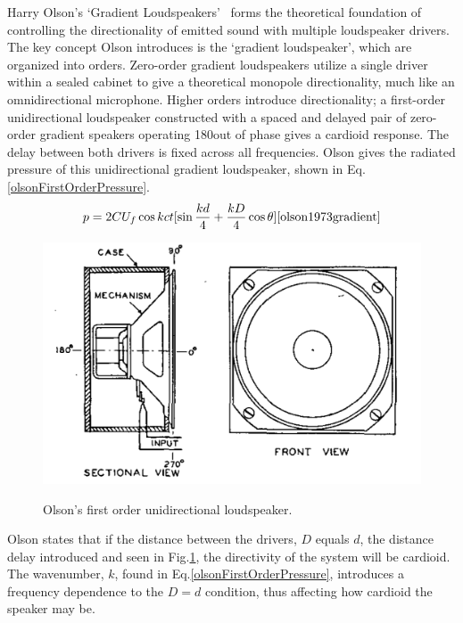 \documentclass{report}
\begin{document}
        Harry Olson's `Gradient Loudspeakers'~\cite{olson1973gradient} forms the theoretical foundation of controlling the directionality of emitted sound with multiple loudspeaker drivers.
        The key concept Olson introduces is the `gradient loudspeaker', which are organized into orders.
        Zero-order gradient loudspeakers utilize a single driver within a sealed cabinet to give a theoretical monopole directionality, much like an omnidirectional microphone.
        Higher orders introduce directionality; a first-order unidirectional loudspeaker constructed with a spaced and delayed pair of zero-order gradient speakers operating 180\degree\@ out of phase gives a cardioid response.
        The delay between both drivers is fixed across all frequencies.
        Olson gives the radiated pressure of this unidirectional gradient loudspeaker, shown in Eq.\ref{olsonFirstOrderPressure}.
        \begin{equation}
            p = 2CU_f\cos{kct}[\sin{\frac{kd}{4}+\frac{kD}{4}\cos{\theta}}]
            \label{olsonFirstOrderPressure}
            \cite{olson1973gradient}
        \end{equation}
        \begin{figure}[H]
            \centering
            \includegraphics[scale=0.2]{figs/olsonFirstOrder.png}%
            \caption{Olson's first order unidirectional loudspeaker.}\cite{olson1973gradient}
            \label{olsonFirstOrderDiagram}
        \end{figure}
        Olson states that if the distance between the drivers, $D$ equals $d$, the distance delay introduced and seen in Fig.\ref{olsonFirstOrderDiagram}, the directivity of the system will be cardioid.
        The wavenumber, $k$, found in Eq.\ref{olsonFirstOrderPressure}, introduces a frequency dependence to the $D=d$ condition, thus affecting how cardioid the speaker may be.
        
\end{document}
